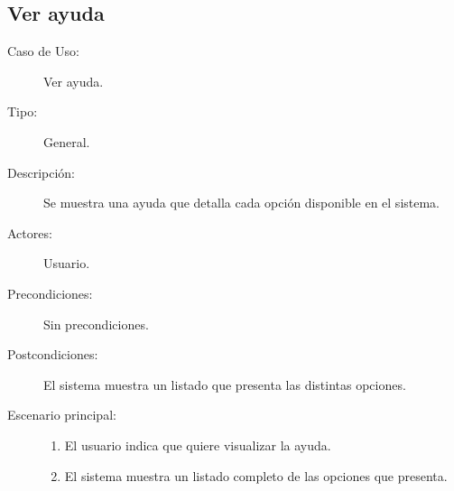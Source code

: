 \subsection{Ver ayuda}
\begin{framed}
\FloatBarrier
\begin{description}
   \item[Caso de Uso:]  Ver ayuda.
   \item[Tipo:] General.
   \item[Descripción:] 
   Se muestra una ayuda que detalla cada opción disponible en el sistema.
   \item[Actores:] 
   Usuario.
   \item[Precondiciones:] 
   Sin precondiciones.
   \item[Postcondiciones:] 
   El sistema muestra un listado que presenta las distintas opciones.
   \item[Escenario principal:] \hfill
   \begin{enumerate}
   \item El usuario indica que quiere visualizar la ayuda.
   \item El sistema muestra un listado completo de las opciones que
   presenta. 
   \end{enumerate}
\end{description}
 \FloatBarrier
\end{framed}
